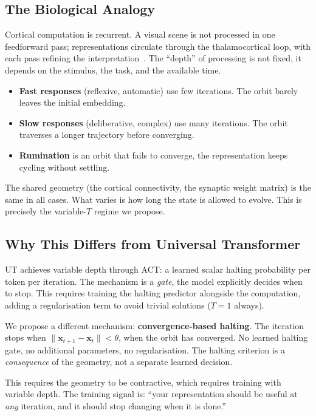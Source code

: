 \documentclass[11pt, a4paper]{article}
\newcommand{\x}{\mathbf{x}}
\theoremstyle{plain}
\theoremstyle{definition}
\theoremstyle{remark}
\begin{document}
\subsection{The Biological Analogy}

Cortical computation is recurrent.
A visual scene is not processed in one feedforward pass; representations circulate through the thalamocortical loop, with each pass refining the interpretation~\cite{lamme2000distinct}.
The ``depth'' of processing is not fixed, it depends on the stimulus, the task, and the available time.

\begin{itemize}[nosep]
    \item \textbf{Fast responses} (reflexive, automatic) use few iterations. The orbit barely leaves the initial embedding.
    \item \textbf{Slow responses} (deliberative, complex) use many iterations. The orbit traverses a longer trajectory before converging.
    \item \textbf{Rumination} is an orbit that fails to converge, the representation keeps cycling without settling.
\end{itemize}

The shared geometry (the cortical connectivity, the synaptic weight matrix) is the same in all cases.
What varies is how long the state is allowed to evolve.
This is precisely the variable-$T$ regime we propose.

\subsection{Why This Differs from Universal Transformer}

UT achieves variable depth through ACT: a learned scalar halting probability per token per iteration.
The mechanism is a \emph{gate}, the model explicitly decides when to stop.
This requires training the halting predictor alongside the computation, adding a regularisation term to avoid trivial solutions ($T{=}1$ always).

We propose a different mechanism: \textbf{convergence-based halting}.
The iteration stops when $\|\x_{t+1} - \x_t\| < \theta$, when the orbit has converged.
No learned halting gate, no additional parameters, no regularisation.
The halting criterion is a \emph{consequence} of the geometry, not a separate learned decision.

This requires the geometry to be contractive, which requires training with variable depth.
The training signal is: ``your representation should be useful at \emph{any} iteration, and it should stop changing when it is done.''
\end{document}
